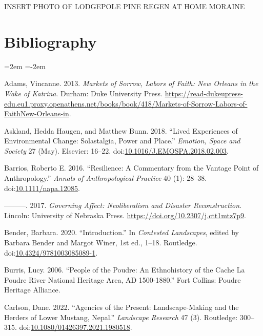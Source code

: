 \documentclass[
]{article}
\newlength{\cslhangindent}
\newenvironment{CSLReferences}[2] %
 {\begin{list}{}{%
  \setlength{\itemindent}{0pt}
  \setlength{\leftmargin}{0pt}
  \setlength{\parsep}{0pt}
  \ifodd #1
   \setlength{\leftmargin}{\cslhangindent}
   \setlength{\itemindent}{-1\cslhangindent}
  \fi
  \setlength{\itemsep}{#2\baselineskip}}}
 {\end{list}}
\begin{document}
INSERT PHOTO OF LODGEPOLE PINE REGEN AT HOME MORAINE

\clearpage

\section*{Bibliography}

\noindent
\leftskip=2em
\parindent=-2em

\label{refs}
\begin{CSLReferences}{1}{0}
Adams, Vincanne. 2013. \emph{Markets of {Sorrow}, {Labors} of {Faith}: {New Orleans} in the {Wake} of {Katrina}}. Durham: Duke University Press. \url{https://read-dukeupress-edu.eu1.proxy.openathens.net/books/book/418/Markets-of-Sorrow-Labors-of-FaithNew-Orleans-in}.

Askland, Hedda Haugen, and Matthew Bunn. 2018. {``Lived Experiences of Environmental Change: {Solastalgia}, Power and Place.''} \emph{Emotion, Space and Society} 27 (May). Elsevier: 16--22. doi:\href{https://doi.org/10.1016/J.EMOSPA.2018.02.003}{10.1016/J.EMOSPA.2018.02.003}.

Barrios, Roberto E. 2016. {``Resilience: {A} Commentary from the Vantage Point of Anthropology.''} \emph{Annals of Anthropological Practice} 40 (1): 28--38. doi:\href{https://doi.org/10.1111/napa.12085}{10.1111/napa.12085}.

---------. 2017. \emph{Governing {Affect}: {Neoliberalism} and {Disaster Reconstruction}}. Lincoln: University of Nebraska Press. \url{https://doi.org/10.2307/j.ctt1mtz7p9}.

Bender, Barbara. 2020. {``Introduction.''} In \emph{Contested {Landscapes}}, edited by Barbara Bender and Margot Winer, 1st ed., 1--18. Routledge. doi:\href{https://doi.org/10.4324/9781003085089-1}{10.4324/9781003085089-1}.

Burris, Lucy. 2006. {``People of the {Poudre}: {An Ethnohistory} of the {Cache} La {Poudre River National Heritage Area}, {AD} 1500-1880.''} Fort Collins: Poudre Heritage Alliance.

Carlson, Dane. 2022. {``Agencies of the Present: Landscape-Making and the Herders of Lower {Mustang}, {Nepal}.''} \emph{Landscape Research} 47 (3). Routledge: 300--315. doi:\href{https://doi.org/10.1080/01426397.2021.1980518}{10.1080/01426397.2021.1980518}.


\end{CSLReferences}
\end{document}
